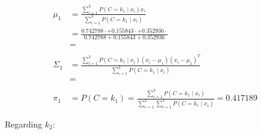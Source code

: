 \documentclass[12pt]{article}
\begin{document}
\begin{enumerate}[leftmargin=\labelsep]
\begin{itemize}[leftmargin=]
                \begin{equation*}
                  \begin{aligned}
                    \mu_1    & = \frac{\sum_{i=1}^3 P(C = k_1 \mid x_i) x_i}{\sum_{i=1}^3 P(C = k_1 \mid x_i)}                                                                                      \\
                             & = \frac{0.742788 \cdot  + 0.155843 \cdot  + 0.352936 \cdot }{0.742788 + 0.155843 + 0.352936} \\
                             & =                                                                                                                              \\
                    \\
                    \Sigma_1 & = \frac{\sum_{i=1}^3 P(C = k_1 \mid x_i) (x_{i} - \mu_{1}) (x_{i} - \mu_{1})^T}{\sum_{i=1}^3 P(C = k_1 \mid x_i)}                                                    \\
                             & =                                                                                                                           \\
                    \\
                    \pi_1    & = P(C = k_1) = \frac{\sum_{i=1}^3 P(C = k_1 \mid x_i)}{\sum_{c=1}^2\sum_{i=1}^3 P(C = k_c \mid x_i)} = 0.417189
                  \end{aligned}
                \end{equation*}

                Regarding $k_2$:


\end{itemize}
\end{enumerate}
\end{document}
